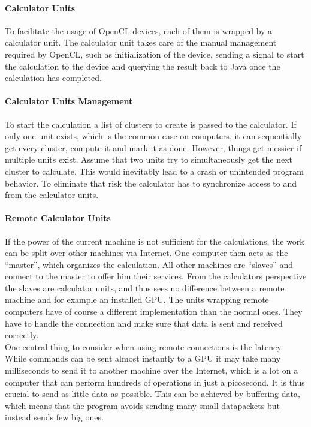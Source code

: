 \documentclass[10pt,a4paper,titlepage]{article}
\begin{document}
	\paragraph{Calculator Units}
	To facilitate the usage of OpenCL devices, each of them is wrapped by a calculator unit. The calculator unit takes care of the manual management required by OpenCL, such as initialization of the device, sending a signal to start the calculation to the device and querying the result back to Java once the calculation has completed.
	\paragraph{Calculator Units Management}
	To start the calculation a list of clusters to create is passed to the calculator. If only one unit exists, which is the common case on computers, it can sequentially get every cluster, compute it and mark it as done. However, things get messier if multiple units exist. Assume that two units try to simultaneously get the next cluster to calculate. This would inevitably lead to a crash or unintended program behavior. To eliminate that risk the calculator has to synchronize access to and from the calculator units.
	\paragraph{Remote Calculator Units}
	If the power of the current machine is not sufficient for the calculations, the work can be split over other machines via Internet. One computer then acts as the ``master'', which organizes the calculation. All other machines are ``slaves'' and connect to the master to offer him their services. From the calculators perspective the slaves are calculator units, and thus sees no difference between a remote machine and for example an installed GPU. The units wrapping remote computers have of course a different implementation than the normal ones. They have to handle the connection and make sure that data is sent and received correctly.\\
	One central thing to consider when using remote connections is the latency. While commands can be sent almost instantly to a GPU it may take many milliseconds to send it to another machine over the Internet, which is a lot on a computer that can perform hundreds of operations in just a picosecond. It is thus crucial to send as little data as possible. This can be achieved by buffering data, which means that the program avoids sending many small datapackets but instead sends few big ones.
\end{document}
